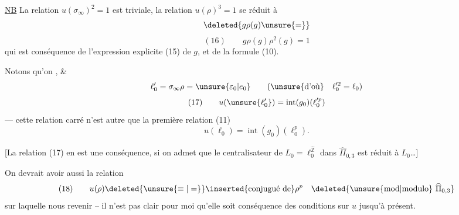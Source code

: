 
\uline{NB} La relation  $u(\sigma_\infty)^2=1$ est triviale, la relation $u(\rho)^3=1$ se réduit à
\[
\deleted{g\rho(g)\unsure{=}}
\]
\[
(16)\qquad g\rho(g)\rho^2(g)=1
\]
qui est conséquence de l'expression explicite (15) de $g$, et de la formule (10).

Notons qu'on  , \& 
\[
\ell'_0=\sigma_\infty\rho=\unsure{\varepsilon_0|e_0}\qquad
(\text{\unsure{d'où}}\quad \ell_0^{\prime 2}=\ell_0)
\]
\[
(17)\qquad
u(\unsure{\ell'_0})
=\operatorname{int}(g_0)(\ell_0^{\prime p})
\]
--- cette relation  carré n'est autre que la première relation (11)
\[
u(\ell_0)=\operatorname{int}(g_0)(\ell_0^p).
\]

[La relation (17) en est une conséquence, si on admet que le centralisateur de $L_0=\ell_0^{\widehat{\mathbb Z}}$ dans $\widehat{\Pi}_{0,3}$ est réduit à $L_0$\ldots]

On devrait avoir aussi la relation
\[
(18)\qquad u(\rho)\deleted{\unsure{\equiv|=}}\inserted{\text{conjugué de}}\rho^p
\quad\deleted{\text{\unsure{mod|modulo}}\ \widehat{\Pi}_{0,3}}
\]
 sur laquelle nous  revenir -- il n'est pas clair pour moi qu'elle soit conséquence des conditions  sur $u$ jusqu'à présent.
